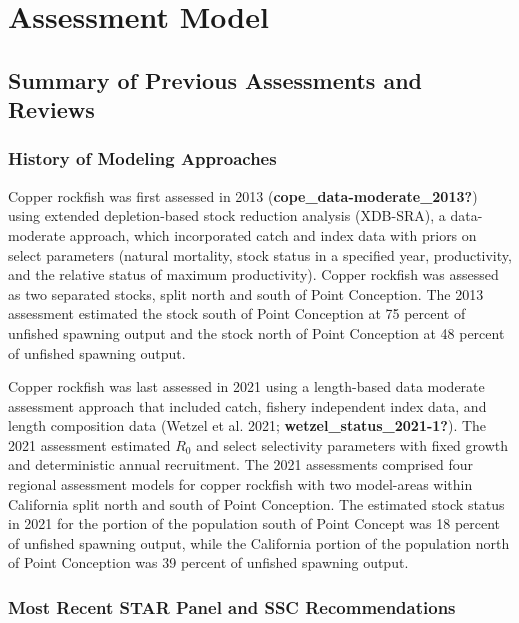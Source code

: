 \documentclass[11pt,
  english,
  letterpaper,
]{article}
\begin{document}
\hypertarget{assessment-model}{%
\section{Assessment Model}\label{assessment-model}}

\hypertarget{summary-of-previous-assessments-and-reviews}{%
\subsection{Summary of Previous Assessments and Reviews}\label{summary-of-previous-assessments-and-reviews}}

\hypertarget{history-of-modeling-approaches}{%
\subsubsection{History of Modeling Approaches}\label{history-of-modeling-approaches}}

Copper rockfish was first assessed in 2013 (\textbf{cope\_data-moderate\_2013?}) using extended depletion-based stock reduction analysis (XDB-SRA), a data-moderate approach, which incorporated catch and index data with priors on select parameters (natural mortality, stock status in a specified year, productivity, and the relative status of maximum productivity). Copper rockfish was assessed as two separated stocks, split north and south of Point Conception. The 2013 assessment estimated the stock south of Point Conception at 75 percent of unfished spawning output and the stock north of Point Conception at 48 percent of unfished spawning output.

Copper rockfish was last assessed in 2021 using a length-based data moderate assessment approach that included catch, fishery independent index data, and length composition data (Wetzel et al. 2021; \textbf{wetzel\_status\_2021-1?}). The 2021 assessment estimated \(R_0\) and select selectivity parameters with fixed growth and deterministic annual recruitment. The 2021 assessments comprised four regional assessment models for copper rockfish with two model-areas within California split north and south of Point Conception. The estimated stock status in 2021 for the portion of the population south of Point Concept was 18 percent of unfished spawning output, while the California portion of the population north of Point Conception was 39 percent of unfished spawning output.

\hypertarget{most-recent-star-panel-and-ssc-recommendations}{%
\subsubsection{Most Recent STAR Panel and SSC Recommendations}\label{most-recent-star-panel-and-ssc-recommendations}}
\end{document}
